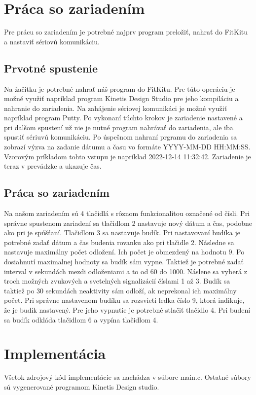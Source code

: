 \documentclass{article}
\begin{document}
\section{Práca so zariadením}
Pre prácu so zariadením je potrebné najprv program preložiť, nahrať do FitKitu a nastaviť sériovú komunikáciu.

\subsection{Prvotné spustenie}
Na žačitku je potrebné nahrať náš program do FitKitu. Pre túto operáciu je možné využiť napríklad program Kinetis Design Studio pre jeho kompiláciu a nahranie do zariadenia. Na zahájenie sériovej komunikáci je možné využiť napríklad program Putty. Po vykonaní túchto krokov je zariadenie nastavené a pri dalšom spustení už nie je nutné program nahrávať do zariadenia, ale iba spustiť sériuvú komunikáciu. Po úspešnom nahraní prgramu do zariadenia sa zobrazí výzva na zadanie dátumu a času vo formáte YYYY-MM-DD HH:MM:SS. Vzorovým príkladom tohto vstupu je napríklad 2022-12-14 11:32:42. Zariadenie je teraz v prevádzke a ukazuje čas.

\subsection{Práca so zariadením}
Na našom zariadením sú 4 tlačidlá s rôznom funkcionalitou označené od čísli. Pri správne spustenom zariadení sa tlačidlom 2 nastavuje nový dátum a čas, podobne ako pri je spúšťaní. Tlačidlom 3 sa nastavuje budík. Pri nastavovaní budíka je potrebné zadať dátum a čas budenia rovanku ako pri tlačidle 2. Následne sa nastavuje maximálny počet odložení. Ich počet je obmezdený na hodnotu 9. Po dosiahnutí maximalnej hodnoty sa budík sám vypne. Taktiež je potrebné zadať interval v sekundách mezdi odloženiami a to od 60 do 1000. Náslene sa vyberá z troch možných zvukových a svetelných signalizácií číslami 1 až 3. Budík sa taktiež po 30 sekundách neaktivity sám odloží, ak neprekonal ich maximálny počet. Pri správne nastavenom budíku sa rozsvieti ledka číslo 9, ktorá indikuje, že je budík nastavený. Pre jeho vypnutie je potrebné stlačiť tlačidlo 4. Pri budení sa budík odkláda tlačidlom 6 a vypína tlačidlom 4.

\section{Implementácia}
Všetok zdrojový kód implementácie sa nachádza v súbore main.c. Ostatné súbory sú vygenerované programom Kinetis Design studio. 
\end{document}
